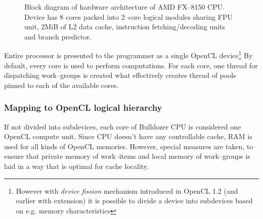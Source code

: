 \begin{figure}[htb]
  \begin{center}
    \scalebox{0.9} {
      
    }
  \end{center}
  \caption{Block diagram of hardware architecture of AMD FX--8150 CPU. Device
    has 8 cores packed into 2--core logical modules sharing FPU unit, 2MiB of
    L2 data cache, instruction fetching/decoding units and branch predictor.}
  \label{fig:bulldozerarch}
\end{figure}

Entire processor is presented to the programmer as a single OpenCL
device\footnote{However with \emph{device fission} mechanism introduced in OpenCL 1.2 (and
earlier with extension) it is possible to divide a device into subdevices based on e.g. memory characteristics}
By default, every core is used to perform computations. For each core, one
thread for dispatching work--groups is created what effectively creates thread
of pools pinned to each of the available cores.

\subsubsection{Mapping to OpenCL logical hierarchy}
If not divided into subdevices, each core of Bulldozer CPU is considered one
OpenCL compute unit. Since CPU doesn't have any controllable cache, RAM is used
for all kinds of OpenCL memories. However, special measures are taken, to ensure
that private memory of work--items and local memory of work--groups is
laid in a way that is optimal for cache locality.
